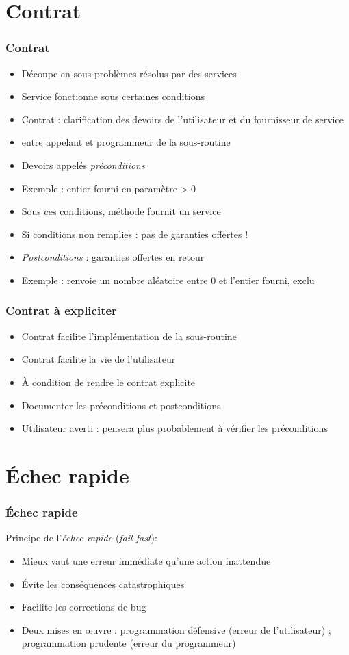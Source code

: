 \documentclass[english, french]{beamer}
\begin{document}
\section{Contrat}
\begin{frame}
	\frametitle{Contrat}
	\begin{itemize}
		\item Découpe en sous-problèmes résolus par des services
		\item Service fonctionne sous certaines conditions
		\item Contrat : clarification des devoirs de l’utilisateur et du fournisseur de service
		\item entre appelant et programmeur de la sous-routine
		\item Devoirs appelés \emph{préconditions}
		\item Exemple : entier fourni en paramètre > 0
		\item Sous ces conditions, méthode fournit un service
		\item Si conditions non remplies : pas de garanties offertes !
		\item \emph{Postconditions} : garanties offertes en retour
		\item Exemple : renvoie un nombre aléatoire entre 0 et l’entier fourni, exclu
	\end{itemize}
\end{frame}

\begin{frame}
	\frametitle{Contrat à expliciter}
	\begin{itemize}
		\item Contrat facilite l’implémentation de la sous-routine
		\item Contrat facilite la vie de l’utilisateur
		\item À condition de rendre le contrat explicite
		\item Documenter les préconditions et postconditions
		\item Utilisateur averti : pensera plus probablement à vérifier les préconditions
	\end{itemize}
\end{frame}

\section{Échec rapide}
\begin{frame}
	\frametitle{Échec rapide}
	Principe de l’\emph{échec rapide} (\emph{fail-fast}):
	\begin{itemize}
		\item Mieux vaut une erreur immédiate qu’une action inattendue
		\item Évite les conséquences catastrophiques
		\item Facilite les corrections de bug
		\item Deux mises en œuvre : programmation défensive (erreur de l’utilisateur) ; programmation prudente (erreur du programmeur)
	\end{itemize}
\end{frame}
\end{document}
